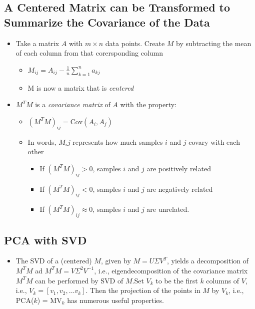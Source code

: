 \documentclass[10pt]{article}
\begin{document}
\subsection*{A Centered Matrix can be Transformed to Summarize the Covariance of the Data}
\begin{itemize}
    \item Take a matrix $A$ with $m \times n$ data points.  Create $M$ by subtracting the mean of each column from that corersponding column
    \begin{itemize}
        \item $M_{ij} = A_{ij} - \frac{1}{n} \sum_{k = 1}^n a_{kj}$
        \item M is now a matrix that is \textit{centered}
    \end{itemize}
    \item $M^T M$ is a \textit{covariance matrix} of $A$ with the property:
    \begin{itemize}
        \item $(M^T M)_{ij} = \text{Cov}(A_i, A_j)$
        \item In words, $M_ij$ represents how much samples $i$ and $j$ covary with each other
        \begin{itemize}
            \item If $(M^T M)_{ij} > 0$, samples $i$ and $j$ are positively related
            \item If $(M^T M)_{ij} < 0$, samples $i$ and $j$ are negatively related
            \item If $(M^T M)_{ij} \approx 0$, samples $i$ and $j$ are unrelated.
        \end{itemize}
    \end{itemize}
\end{itemize}

\subsection*{PCA with SVD}
\begin{itemize}
    \item The SVD of a (centered) $M$, given by $M = U\Sigma V^T$, yields a decomposition of $M^T M$ ad $M^T M = V \Sigma^2 V^{-1}$, i.e., eigendecomposition of the covariance matrix $M^T M$ can be performed by SVD of $M$.Set $V_k$ to be the first $k$ columns of $V$, i.e., $V_k = [v_1, v_2, \dots v_k]$.  Then the projection of the points in $M$ by $V_k$, i.e., PCA($k$) = MV$_k$ has numerous useful properties.
\end{itemize}
\end{document}
